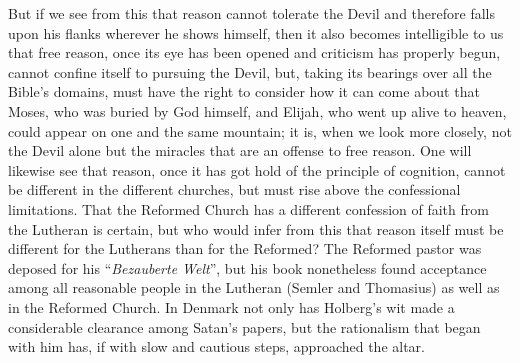 \documentclass[12pt,a4paper]{article}
\newcommand{\opage}[1]{\marginnote{\footnotesize\textit{[#1]}}}
\begin{document}
But if we see from this that reason cannot tolerate the Devil and therefore
falls upon his flanks wherever he shows himself, then it also becomes
intelligible to us that free reason, once its eye has been opened and
criticism has properly begun, cannot confine itself to pursuing the Devil,
but, taking its bearings over all the Bible's
\opage{26}domains, must have the right to consider how it can come about that Moses,
who was buried by God himself, and Elijah, who went up alive to heaven,
could appear on one and the same mountain; it is, when we look more
closely, not the Devil alone but the miracles that are an offense to free
reason. One will likewise see that reason, once it has got hold of the
principle of cognition, cannot be different in the different churches, but
must rise above the confessional limitations. That the Reformed Church has
a different confession of faith from the Lutheran is certain, but who would
infer from this that reason itself must be different for the Lutherans than
for the Reformed? The Reformed pastor was deposed for his ``\textit{Bezauberte
Welt}'', but his book nonetheless found acceptance among all reasonable
people in the Lutheran (Semler and Thomasius) as well as in the Reformed
Church. In Denmark not only has Holberg's wit made a considerable clearance
among Satan's papers, but the rationalism that began with him has, if with
slow and cautious steps, approached the altar.
\end{document}
